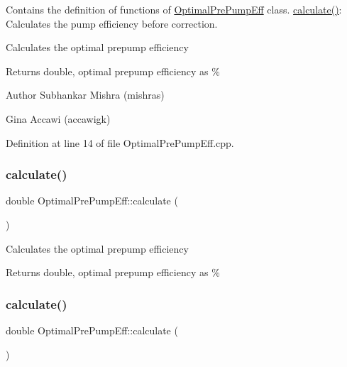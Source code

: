 Contains the definition of functions of \hyperlink{class_optimal_pre_pump_eff}{Optimal\+Pre\+Pump\+Eff} class. \hyperlink{class_optimal_pre_pump_eff_a7ced63984a89975c4f8f54642701d841}{calculate()}\+: Calculates the pump efficiency before correction. 

Calculates the optimal prepump efficiency \begin{DoxyReturn}{Returns}
double, optimal prepump efficiency as \%
\end{DoxyReturn}
\begin{DoxyAuthor}{Author}
Subhankar Mishra (mishras) 

Gina Accawi (accawigk) 
\end{DoxyAuthor}


Definition at line 14 of file Optimal\+Pre\+Pump\+Eff.\+cpp.

\mbox{\label{class_optimal_pre_pump_eff_a7ced63984a89975c4f8f54642701d841}} 
\subsubsection{\texorpdfstring{calculate()}{calculate()}\hspace{0.1cm}{\footnotesize\ttfamily [2/3]}}
{\footnotesize\ttfamily double Optimal\+Pre\+Pump\+Eff\+::calculate (\begin{DoxyParamCaption}{ }\end{DoxyParamCaption})}

Calculates the optimal prepump efficiency \begin{DoxyReturn}{Returns}
double, optimal prepump efficiency as \% 
\end{DoxyReturn}
\mbox{\label{class_optimal_pre_pump_eff_a7ced63984a89975c4f8f54642701d841}} 
\subsubsection{\texorpdfstring{calculate()}{calculate()}\hspace{0.1cm}{\footnotesize\ttfamily [3/3]}}
{\footnotesize\ttfamily double Optimal\+Pre\+Pump\+Eff\+::calculate (\begin{DoxyParamCaption}{ }\end{DoxyParamCaption})}

